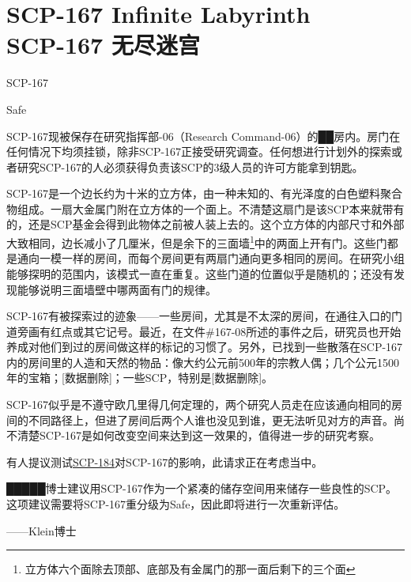 \chapter[SCP-167 无尽迷宫]{
    SCP-167 Infinite Labyrinth\\
    SCP-167 无尽迷宫
}

\label{chap:SCP-167}

SCP-167

Safe

SCP-167现被保存在研究指挥部-06（Research Command-06）的██房内。房门在任何情况下均须挂锁，除非SCP-167正接受研究调查。任何想进行计划外的探索或者研究SCP-167的人必须获得负责该SCP的3级人员的许可方能拿到钥匙。

SCP-167是一个边长约为十米的立方体，由一种未知的、有光泽度的白色塑料聚合物组成。一扇大金属门附在立方体的一个面上。不清楚这扇门是该SCP本来就带有的，还是SCP基金会得到此物体之前被人装上去的。这个立方体的内部尺寸和外部大致相同，边长减小了几厘米，但是余下的三面墙\footnote{立方体六个面除去顶部、底部及有金属门的那一面后剩下的三个面}中的两面上开有门。这些门都是通向一模一样的房间，而每个房间更有两扇门通向更多相同的房间。在研究小组能够探明的范围内，该模式一直在重复。这些门道的位置似乎是随机的；还没有发现能够说明三面墙壁中哪两面有门的规律。

SCP-167有被探索过的迹象——一些房间，尤其是不太深的房间，在通往入口的门道旁画有红点或其它记号。最近，在文件\#167-08所述的事件之后，研究员也开始养成对他们到过的房间做这样的标记的习惯了。另外，已找到一些散落在SCP-167内的房间里的人造和天然的物品：像大约公元前500年的宗教人偶；几个公元1500年的宝箱；{[}数据删除]；一些SCP，特别是{[}数据删除]。

SCP-167似乎是不遵守欧几里得几何定理的，两个研究人员走在应该通向相同的房间的不同路径上，但进了房间后两个人谁也没见到谁，更无法听见对方的声音。尚不清楚SCP-167是如何改变空间来达到这一效果的，值得进一步的研究考察。

有人提议测试\hyperref[chap:SCP-184]{SCP-184}对SCP-167的影响，此请求正在考虑当中。

█████博士建议用SCP-167作为一个紧凑的储存空间用来储存一些良性的SCP。这项建议需要将SCP-167重分级为Safe，因此即将进行一次重新评估。

——Klein博士
